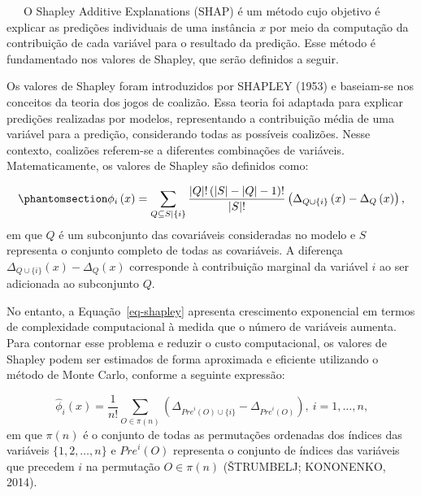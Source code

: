 \documentclass[
  12pt,
  a4paper,
]{scrreprt}
\begin{document}
~~~O Shapley Additive Explanations (SHAP) é um método cujo objetivo é
explicar as predições individuais de uma instância \(x\) por meio da
computação da contribuição de cada variável para o resultado da
predição. Esse método é fundamentado nos valores de Shapley, que serão
definidos a seguir.

\vspace{12pt}

Os valores de Shapley foram introduzidos por SHAPLEY (1953) e baseiam-se
nos conceitos da teoria dos jogos de coalizão. Essa teoria foi adaptada
para explicar predições realizadas por modelos, representando a
contribuição média de uma variável para a predição, considerando todas
as possíveis coalizões. Nesse contexto, coalizões referem-se a
diferentes combinações de variáveis. Matematicamente, os valores de
Shapley são definidos como:

\begin{equation}\phantomsection\label{eq-shapley}{
\phi_i\left(x\right) = \sum_{Q \subseteq S | \{i\}} \frac{|Q|!\left(|S| - |Q| - 1\right)!}{|S|!} \left(\Delta_{Q\cup \{i\}}\left(x\right) - \Delta_{Q}\left(x\right)\right)\text{,}
}\end{equation} em que \(Q\) é um subconjunto das covariáveis
consideradas no modelo e \(S\) representa o conjunto completo de todas
as covariáveis. A diferença
\(\Delta_{Q \cup \{i\}}\left(x\right) - \Delta_{Q}\left(x\right)\)
corresponde à contribuição marginal da variável \(i\) ao ser adicionada
ao subconjunto \(Q\).

\vspace{12pt}

No entanto, a Equação~\ref{eq-shapley} apresenta crescimento exponencial
em termos de complexidade computacional à medida que o número de
variáveis aumenta. Para contornar esse problema e reduzir o custo
computacional, os valores de Shapley podem ser estimados de forma
aproximada e eficiente utilizando o método de Monte Carlo, conforme a
seguinte expressão:

\[
\hat{\phi}_{i}\left(x\right) = \frac{1}{n!} \sum_{O \in \pi \left(n \right)} \left( \Delta_{{Pre}^{i} \left(O\right) \cup \{i\}} - \Delta_{{Pre}^{i} \left(O\right)} \right), \ i = 1, \dots, n\text{,}
\] em que \(\pi\left(n\right)\) é o conjunto de todas as permutações
ordenadas dos índices das variáveis \(\{1, 2, \dots, n\}\) e
\({Pre}^{i}\left(O\right)\) representa o conjunto de índices das
variáveis que precedem \(i\) na permutação \(O \in \pi \left(n\right)\)
(ŠTRUMBELJ; KONONENKO, 2014).
\end{document}
